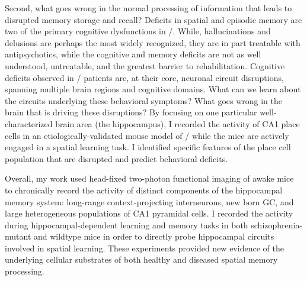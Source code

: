 Second, what goes wrong in the normal processing of information that leads to disrupted memory storage and recall?
Deficits in spatial and episodic memory are two of the primary cognitive dysfunctions in \scz/.
While, hallucinations and delusions are perhaps the most widely recognized, they are in part treatable with antipsychotics, while the cognitive and memory deficits are not as well understood, untreatable, and the greatest barrier to rehabilitation.
Cognitive deficits observed in \scz/ patients are, at their core, neuronal circuit disruptions, spanning multiple brain regions and cognitive domains.
What can we learn about the circuits underlying these behavioral symptoms?
What goes wrong in the brain that is driving these disruptions?
By focusing on one particular well-characterized brain area (the hippocampus), I recorded the activity of CA1 place cells in an etiologically-validated mouse model of \scz/ while the mice are actively engaged in a spatial learning task.
I identified specific features of the place cell population that are disrupted and predict behavioral deficits.

Overall, my work used head-fixed two-photon functional imaging of awake mice to chronically record the activity of distinct components of the hippocampal memory system: long-range context-projecting interneurons, new born GC, and large heterogeneous populations of CA1 pyramidal cells.
I recorded the activity during hippocampal-dependent learning and memory tasks in both schizophrenia-mutant and wildtype mice in order to directly probe hippocampal circuits involved in spatial learning.
These experiments provided new evidence of the underlying cellular substrates of both healthy and diseased spatial memory processing.



